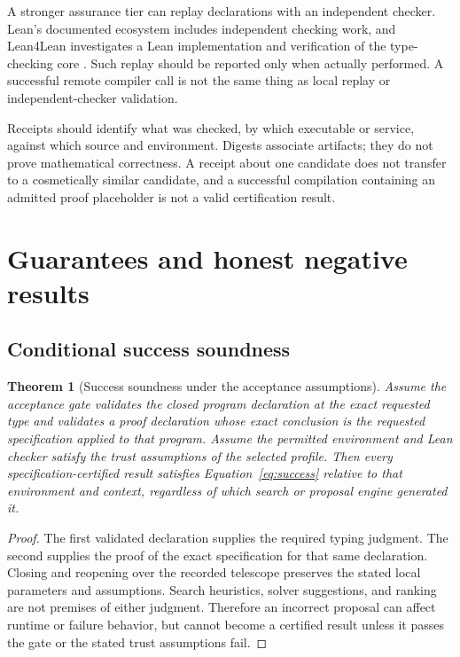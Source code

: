 \documentclass[11pt,letterpaper]{article}
\newtheorem{theorem}{Theorem}[section]
\theoremstyle{definition}
\theoremstyle{remark}
\begin{document}
A stronger assurance tier can replay declarations with an independent checker. Lean's documented ecosystem includes independent checking work, and Lean4Lean investigates a Lean implementation and verification of the type-checking core \cite{leanmanual,lean4lean}. Such replay should be reported only when actually performed. A successful remote compiler call is not the same thing as local replay or independent-checker validation.

Receipts should identify what was checked, by which executable or service, against which source and environment. Digests associate artifacts; they do not prove mathematical correctness. A receipt about one candidate does not transfer to a cosmetically similar candidate, and a successful compilation containing an admitted proof placeholder is not a valid certification result.

\section{Guarantees and honest negative results}
\label{sec:guarantees}

\subsection{Conditional success soundness}

\begin{theorem}[Success soundness under the acceptance assumptions]
Assume the acceptance gate validates the closed program declaration at the exact requested type and validates a proof declaration whose exact conclusion is the requested specification applied to that program. Assume the permitted environment and Lean checker satisfy the trust assumptions of the selected profile. Then every specification-certified result satisfies Equation~\eqref{eq:success} relative to that environment and context, regardless of which search or proposal engine generated it.
\end{theorem}
\begin{proof}
The first validated declaration supplies the required typing judgment. The second supplies the proof of the exact specification for that same declaration. Closing and reopening over the recorded telescope preserves the stated local parameters and assumptions. Search heuristics, solver suggestions, and ranking are not premises of either judgment. Therefore an incorrect proposal can affect runtime or failure behavior, but cannot become a certified result unless it passes the gate or the stated trust assumptions fail.
\end{proof}
\end{document}
